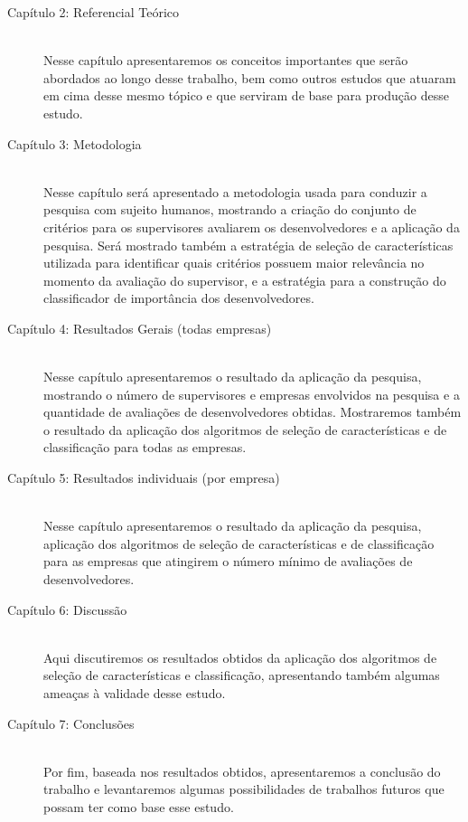\begin{description}
	\item[Capítulo 2: Referencial Teórico] \hfill \\
	Nesse capítulo apresentaremos os conceitos importantes que serão abordados ao longo desse trabalho, bem como outros estudos que atuaram em cima desse mesmo tópico e que serviram de base para produção desse estudo.
	
	\item [Capítulo 3: Metodologia] \hfill \\
	Nesse capítulo será apresentado a metodologia usada para conduzir a pesquisa com sujeito humanos, mostrando a criação do conjunto de critérios para os supervisores avaliarem os desenvolvedores e a aplicação da pesquisa. Será mostrado também a estratégia de seleção de características utilizada para identificar quais critérios possuem maior relevância no momento da avaliação do supervisor, e a estratégia para a construção do classificador de importância dos desenvolvedores.
	
	\item[Capítulo 4: Resultados Gerais (todas empresas) ] \hfill \\
	Nesse capítulo apresentaremos o resultado da aplicação da pesquisa, mostrando o número de supervisores e empresas envolvidos na pesquisa e a quantidade de avaliações de desenvolvedores obtidas. Mostraremos também o resultado da aplicação dos algoritmos de seleção de características e de classificação para todas as empresas.
	
	\item[Capítulo 5: Resultados individuais (por empresa) ] \hfill \\
	Nesse capítulo apresentaremos o resultado da aplicação da pesquisa, aplicação dos algoritmos de seleção de características e de classificação para as empresas que atingirem o número mínimo de avaliações de desenvolvedores.
	
	\item[Capítulo 6: Discussão ] \hfill \\
	Aqui discutiremos os resultados obtidos da aplicação dos algoritmos de seleção de características e classificação, apresentando também algumas ameaças à validade desse estudo.
	
	\item[Capítulo 7: Conclusões ] \hfill \\
	Por fim, baseada nos resultados obtidos, apresentaremos a conclusão do trabalho e levantaremos algumas possibilidades de trabalhos futuros que possam ter como base esse estudo.
	
\end{description}

